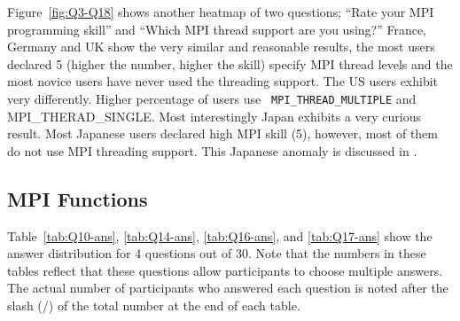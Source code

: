 \documentclass[sigconf,nonacm]{acmart}
\begin{document}
Figure~\ref{fig:Q3-Q18} shows another heatmap of two questions;
``Rate your MPI programming skill'' and ``Which MPI thread support are
you using?'' France, Germany and UK show the very similar and
reasonable results, the most users declared 5 (higher the number,
higher the skill) specify MPI thread levels and the most novice users
have never used the threading support. The US users exhibit very
differently. Higher percentage of users use {\tt
  MPI\_THREAD\_MULTIPLE} and {MPI\_THERAD\_SINGLE}. Most
interestingly Japan exhibits a very curious result. Most Japanese
users declared high MPI skill (5), however, most of them do not
use MPI threading support. This Japanese anomaly is discussed
in \cite{swopp2019}.

\subsection{MPI Functions}

Table~\ref{tab:Q10-ans}, \ref{tab:Q14-ans}, \ref{tab:Q16-ans}, and
\ref{tab:Q17-ans} show the answer distribution for 4 questions out of
30. Note that the numbers in these tables reflect that these questions
allow participants to choose multiple answers. 
The actual number of participants who answered
each question is noted after the slash (/) of the total number
at the end of each table.
\end{document}
